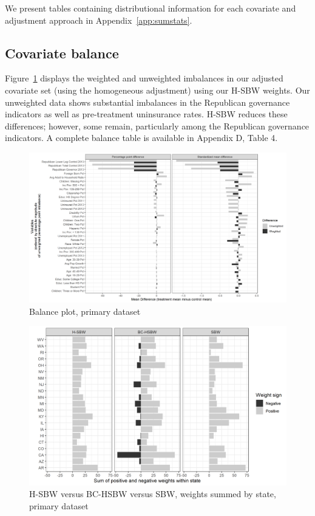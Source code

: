 \documentclass[aoas]{imsart}
\theoremstyle{plain}
\theoremstyle{remark}
\begin{document}
We present tables containing distributional information for each covariate and adjustment approach in Appendix~\ref{app:sumstats}. 

\subsection{Covariate balance}

Figure~\ref{fig:loveplotc1} displays the weighted and unweighted imbalances in our adjusted covariate set (using the homogeneous adjustment) using our H-SBW weights. Our unweighted data shows substantial imbalances in the Republican governance indicators as well as pre-treatment uninsurance rates. H-SBW reduces these differences; however, some remain, particularly among the Republican governance indicators. A complete balance table is available in Appendix D, Table 4. 

\begin{figure}[H]
\begin{center}
    \caption{Balance plot, primary dataset}
    \label{fig:loveplotc1}
    \includegraphics[scale=0.45]{01_Plots/balance-plot-all-etuc1.png}
\end{center}
\end{figure}

\begin{figure}[H]
\begin{center}
    \caption{H-SBW versus BC-HSBW versus SBW, weights summed by state, primary dataset}
    \label{fig:sbwvhsbw1}
    \includegraphics[scale=0.55]{01_Plots/weights-by-state-sbw-hsbw-c1.png}
\end{center}
\end{figure}
\end{document}

